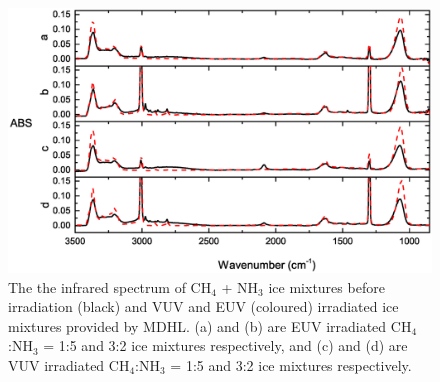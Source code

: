 \begin{figure}
\centering
\includegraphics[width=\textwidth]{figures/chapter3/NSRRC_MDHL_IR.eps}
\caption{The the infrared spectrum of CH$_4$ + NH$_3$ ice mixtures before irradiation (black) and VUV and EUV (coloured) irradiated ice mixtures provided by MDHL. (a) and (b) are EUV irradiated CH$_4$:NH$_3$ = 1:5 and 3:2 ice mixtures respectively, and (c) and (d) are VUV irradiated CH$_4$:NH$_3$ = 1:5 and 3:2 ice mixtures respectively.}
\label{fig:NSRRC_MDHL_IR}
\end{figure}

